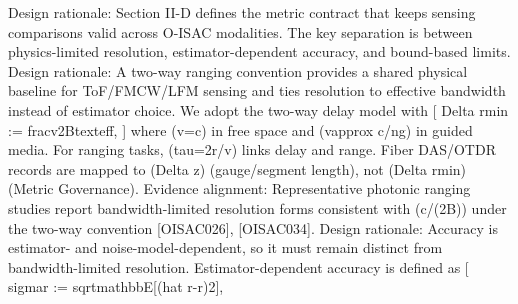 {}Design rationale: Section II-D defines the metric contract that keeps sensing comparisons valid across O-ISAC modalities. The key separation is between physics-limited resolution, estimator-dependent accuracy, and bound-based limits.\markdownRendererInterblockSeparator
{}\markdownRendererSectionBegin
{}\markdownRendererInterblockSeparator
{}Design rationale: A two-way ranging convention provides a shared physical baseline for ToF/FMCW/LFM sensing and ties resolution to effective bandwidth instead of estimator choice.\markdownRendererParagraphSeparator
{}We adopt the two-way delay model with\markdownRendererSoftLineBreak
{}[\markdownRendererSoftLineBreak
{}\markdownRendererBackslash{}Delta r\markdownRendererUnderscore{}\markdownRendererLeftBrace{}\markdownRendererBackslash{}min\markdownRendererRightBrace{} := \markdownRendererBackslash{}frac\markdownRendererLeftBrace{}v\markdownRendererRightBrace{}\markdownRendererLeftBrace{}2B\markdownRendererUnderscore{}\markdownRendererLeftBrace{}\markdownRendererBackslash{}text\markdownRendererLeftBrace{}eff\markdownRendererRightBrace{}\markdownRendererRightBrace{}\markdownRendererRightBrace{},\markdownRendererSoftLineBreak
{}]\markdownRendererSoftLineBreak
{}where (v=c) in free space and (v\markdownRendererBackslash{}approx c/n\markdownRendererUnderscore{}g) in guided media. For ranging tasks, (\markdownRendererBackslash{}tau=2r/v) links delay and range. Fiber DAS/OTDR records are mapped to (\markdownRendererBackslash{}Delta z) (gauge/segment length), not (\markdownRendererBackslash{}Delta r\markdownRendererUnderscore{}\markdownRendererLeftBrace{}\markdownRendererBackslash{}min\markdownRendererRightBrace{}) (Metric Governance).\markdownRendererParagraphSeparator
{}Evidence alignment: Representative photonic ranging studies report bandwidth-limited resolution forms consistent with (c/(2B)) under the two-way convention [O\markdownRendererUnderscore{}ISAC\markdownRendererUnderscore{}026], [O\markdownRendererUnderscore{}ISAC\markdownRendererUnderscore{}034].\markdownRendererInterblockSeparator
{}
\markdownRendererSectionEnd \markdownRendererSectionBegin
{}\markdownRendererInterblockSeparator
{}Design rationale: Accuracy is estimator- and noise-model-dependent, so it must remain distinct from bandwidth-limited resolution.\markdownRendererParagraphSeparator
{}Estimator-dependent accuracy is defined as\markdownRendererSoftLineBreak
{}[\markdownRendererSoftLineBreak
{}\markdownRendererBackslash{}sigma\markdownRendererUnderscore{}r := \markdownRendererBackslash{}sqrt\markdownRendererLeftBrace{}\markdownRendererBackslash{}mathbb\markdownRendererLeftBrace{}E\markdownRendererRightBrace{}[(\markdownRendererBackslash{}hat r-r)\markdownRendererCircumflex{}2]\markdownRendererRightBrace{},\markdownRendererSoftLineBreak
